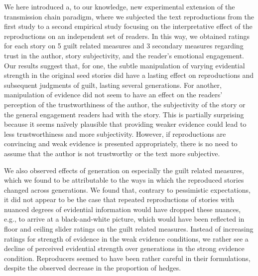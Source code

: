 \documentclass[10pt,letterpaper]{article}
\begin{document}
We here introduced a, to our knowledge, new experimental extension of the transmission chain paradigm, where we subjected the text reproductions from the first study to a second empirical study focusing on the interpretative effect of the reproductions on an independent set of readers. In this way, we obtained ratings for each story on 5 guilt related measures and 3 secondary measures regarding trust in the author, story subjectivity, and the reader's emotional engagement. Our results suggest that, for one, the subtle manipulation of varying evidential strength in the original seed stories did have a lasting effect on reproductions and subsequent judgments of guilt, lasting several generations. For another, manipulation of evidence did not seem to have an effect on the readers' perception of the trustworthiness of the author, the subjectivity of the story or the general engagement readers had with the story. This is partially surprising because it seems na\"ively plausible that providing weaker evidence could lead to less trustworthiness and more subjectivity. However, if reproductions are convincing and weak evidence is presented   appropriately, there is no need to assume that the author is not trustworthy or the text more subjective.

We also observed effects of generation on especially the guilt related measures, which we found to be attributable to the ways in which the reproduced stories changed across generations. We found that, contrary to pessimistic expectations, it did not appear to be the case that repeated reproductions of stories with nuanced degrees of evidential information would have dropped these nuances, e.g., to arrive at a black-and-white picture, which would have been reflected in floor and ceiling slider ratings on the guilt related measures. Instead of increasing ratings for strength of evidence in the weak evidence conditions, we rather see a decline of perceived evidential strength over generations in the strong evidence condition. Reproducers seemed to have been rather careful in their formulations, despite the observed decrease in the proportion of hedges.
\end{document}
